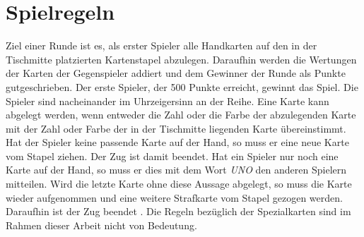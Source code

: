\section{Spielregeln}
Ziel einer Runde ist es, als erster Spieler alle Handkarten auf den in der Tischmitte platzierten Kartenstapel abzulegen. Daraufhin werden die Wertungen der Karten der Gegenspieler addiert und dem Gewinner der Runde als Punkte gutgeschrieben. Der erste Spieler, der 500 Punkte erreicht, gewinnt das Spiel. Die Spieler sind nacheinander im Uhrzeigersinn an der Reihe. Eine Karte kann abgelegt werden, wenn entweder die Zahl oder die Farbe der abzulegenden Karte mit der Zahl oder Farbe der in der Tischmitte liegenden Karte übereinstimmt. Hat der Spieler keine passende Karte auf der Hand, so muss er eine neue Karte vom Stapel ziehen. Der Zug ist damit beendet. Hat ein Spieler nur noch eine Karte auf der Hand, so muss er dies mit dem Wort \textit{UNO} den anderen Spielern mitteilen. Wird die letzte Karte ohne diese Aussage abgelegt, so muss die Karte wieder aufgenommen und eine weitere Strafkarte vom Stapel gezogen werden. Daraufhin ist der Zug beendet \cite{UnoRules}. Die Regeln bezüglich der Spezialkarten sind im Rahmen dieser Arbeit nicht von Bedeutung.